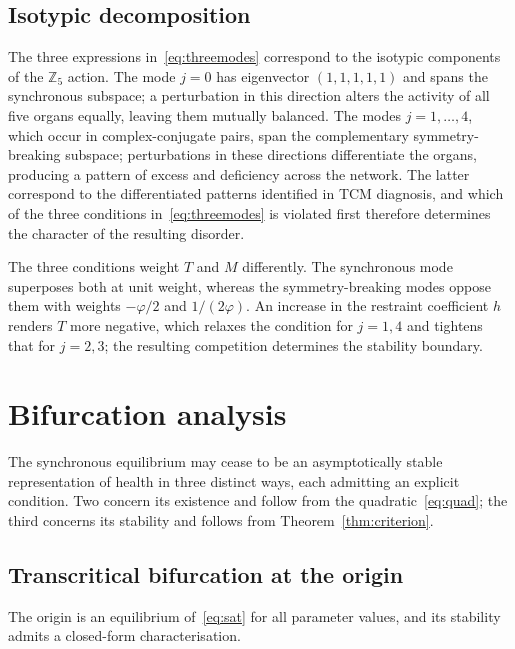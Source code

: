 \documentclass[11pt]{article}
\newcommand{\Z}{{\mathbb{Z}}}
\theoremstyle{definition}
\theoremstyle{remark}
\begin{document}
	\subsection{Isotypic decomposition}\label{sec:modes}
	
	The three expressions in~\eqref{eq:threemodes} correspond to the isotypic components
	of the $\Z_5$ action. The mode $j=0$ has eigenvector $(1,1,1,1,1)$ and spans the
	synchronous subspace; a perturbation in this direction alters the activity of all
	five organs equally, leaving them mutually balanced. The modes $j=1,\dots,4$, which
	occur in complex-conjugate pairs, span the complementary symmetry-breaking subspace;
	perturbations in these directions differentiate the organs, producing a pattern of
	excess and deficiency across the network. The latter correspond to the differentiated
	patterns identified in TCM diagnosis, and which of the three conditions
	in~\eqref{eq:threemodes} is violated first therefore determines the character of the
	resulting disorder.
	
	The three conditions weight $T$ and $M$ differently. The synchronous mode
	superposes both at unit weight, whereas the symmetry-breaking modes oppose them with
	weights $-\varphi/2$ and $1/(2\varphi)$. An increase in the restraint coefficient $h$
	renders $T$ more negative, which relaxes the condition for $j=1,4$ and tightens that
	for $j=2,3$; the resulting competition determines the stability boundary.
	\section{Bifurcation analysis}\label{sec:bifurcation}
	
	The synchronous equilibrium may cease to be an asymptotically stable representation
	of health in three distinct ways, each admitting an explicit condition. Two concern
	its existence and follow from the quadratic~\eqref{eq:quad}; the third concerns its
	stability and follows from Theorem~\ref{thm:criterion}.
	
	\subsection{Transcritical bifurcation at the origin}
	
	The origin is an equilibrium of~\eqref{eq:sat} for all parameter values, and its
	stability admits a closed-form characterisation.
	
\end{document}

